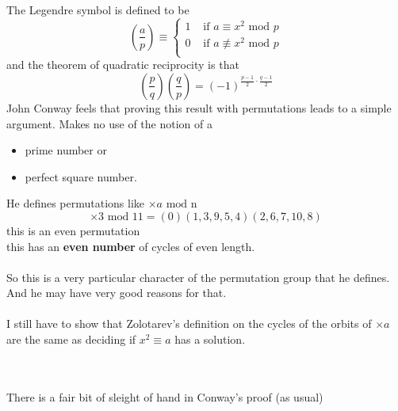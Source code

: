 \documentclass[12pt]{article}
\begin{document}
\noindent The Legendre symbol is defined to be 
$$ \left(\frac{a}{p}\right) \equiv \left\{ 
\begin{array}{cc} 
1 & \text{ if }a \equiv x^2 \text{ mod } p \\
0 & \text{ if }a \not\equiv x^2 \text{ mod } p \\
\end{array}\right. $$
and the theorem of quadratic reciprocity is that
$$ \left(\frac{p}{q}\right)\left(\frac{q}{p}\right)
= (-1)^{\frac{p-1}{2} \cdot \frac{q-1}{2}} $$
John Conway feels that proving this result with permutations leads to a simple argument.   Makes no use of the notion of a 
\begin{itemize}
\item prime number or
\item perfect square number.
\end{itemize}
He defines permutations like $\times a \text{ mod n}$
$$ \times 3 \text{ mod }11 = (0)(1,3,9,5,4)(2,6,7,10,8) $$
{\color{red!20!white}this is an even permutation}\\
this has an \textbf{even number} of {\color{green!80!white}cycles of even length}.  \\ \\
So this is a very particular character of the permutation group that he defines.  And he may have very good reasons for that. \\ \\
I still have to show that Zolotarev's definition on the cycles of the orbits of $\times a$ are the same as deciding if $x^2 \equiv a$ has a solution.\\\\
 \\
There is a fair bit of sleight of hand in Conway's proof (as usual)
\newpage

\noindent 

\selectfont \fontsize{12}{10}\selectfont
\end{document}
